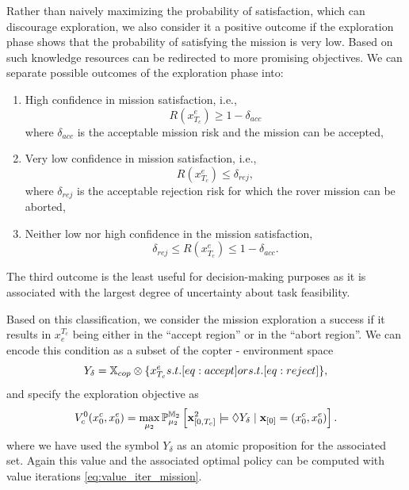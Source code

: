 \documentclass[conference]{IEEEtran}
\begin{document}
Rather than naively maximizing the probability of satisfaction, which can discourage exploration, we also consider it a positive outcome if the exploration phase shows that the probability of satisfying the mission is very low. Based on such knowledge resources can be redirected to more promising objectives. We can separate possible outcomes of the exploration phase into:

\begin{enumerate}
	\item High confidence in mission satisfaction, i.e.,
\begin{equation}\label{eq:accept}
	R(x^e_{T_c})\geq 1-\delta_{acc}
\end{equation}
where $\delta_{acc}$ is the acceptable mission risk and the mission can be accepted,
	\item Very low confidence in mission satisfaction,  i.e.,
\begin{equation}\label{eq:reject}
	R(x^e_{T_c})\leq \delta_{rej},
\end{equation}
where $\delta_{rej}$ is the acceptable rejection risk for which the  rover mission can be aborted,
	\item Neither low nor high confidence in the mission satisfaction,
	 \begin{equation}
	\delta_{rej} \leq R(x^e_{T_c})\leq 1-\delta_{acc}.
\end{equation}
\end{enumerate}
The third outcome is the least useful for decision-making purposes as it is associated with the largest degree of uncertainty about task feasibility.

Based on this classification, we consider the mission exploration a success if it results in $x_e^{T_c}$ being either in the ``accept region'' or in the ``abort region''. We can encode this condition as a subset of the copter - environment space
\begin{equation}
Y_\delta = \X_{cop} \otimes
	\{x^e_{T_c} \mbox{ s.t.  }\eqref{eq:accept}\mbox{ or s.t. }\eqref{eq:reject} \},
\end{equation}
and specify the exploration objective as
\begin{equation}
\label{eq:coptervalue}
	V^0_c(x^c_0, x^e_0) = \max_{\mu_2} \mathbb{P}_{\mu_2}^{\MDP_2} \left[ \mathbf{x}^2_{[0, T_c]} \models \lozenge Y_\delta \mid \mathbf{x}_{[0]} = (x^c_0, x^e_0) \right].
\end{equation}
where we have used the symbol $Y_\delta$ as an atomic proposition for the associated set. Again this value and the associated optimal policy can be computed with value iterations \eqref{eq:value_iter_mission}.
\end{document}
